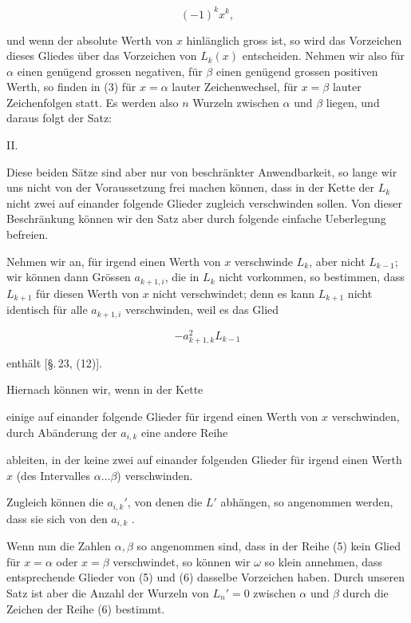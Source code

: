 \[
(-1)^k x^k,
\]

und wenn der absolute Werth von $x$ hinlänglich gross ist, so wird das Vorzeichen dieses Gliedes über das Vorzeichen von $L_k(x)$ entscheiden. Nehmen wir also für $\alpha$ einen genügend grossen negativen, für $\beta$ einen genügend grossen positiven Werth, so finden in (3) für $x=\alpha$ lauter Zeichenwechsel, für $x=\beta$ lauter Zeichenfolgen statt. Es werden also $n$ Wurzeln zwischen $\alpha$ und $\beta$ liegen, und daraus folgt der Satz:

II.\ 

Diese beiden Sätze sind aber nur von beschränkter Anwendbarkeit, so lange wir uns nicht von der Voraussetzung frei machen können, dass in der Kette der $L_k$ nicht zwei auf einander folgende Glieder zugleich verschwinden sollen. Von dieser Beschränkung können wir den Satz aber durch folgende einfache Ueberlegung befreien.

Nehmen wir an, für irgend einen Werth von $x$ verschwinde $L_k$, aber nicht $L_{k-1}$; wir können dann Grössen $a_{k+1,i}$, die in $L_k$ nicht vorkommen, so bestimmen, dass $L_{k+1}$ für diesen Werth von $x$ nicht verschwindet; denn es kann $L_{k+1}$ nicht identisch für alle $a_{k+1,i}$ verschwinden, weil es das Glied

\[
-a_{k+1,k}^2 L_{k-1}
\]

enthält [\S.\,23, (12)].

Hiernach können wir, wenn in der Kette


einige auf einander folgende Glieder für irgend einen Werth von $x$ verschwinden, durch Abänderung der $a_{i,k}$ eine andere Reihe


ableiten, in der keine zwei auf einander folgenden Glieder für irgend einen Werth $x$ (des Intervalles $\alpha \ldots \beta$) verschwinden.

Zugleich können die $a_{i,k}'$, von denen die $L'$ abhängen, so angenommen werden, dass sie sich von den $a_{i,k}$ .

Wenn nun die Zahlen $\alpha, \beta$ so angenommen sind, dass in der Reihe (5) kein Glied für $x=\alpha$ oder $x=\beta$ verschwindet, so können wir $\omega$ so klein annehmen, dass entsprechende Glieder von (5) und (6) dasselbe Vorzeichen haben. Durch unseren Satz ist aber die Anzahl der Wurzeln von $L_n'=0$ zwischen $\alpha$ und $\beta$ durch die Zeichen der Reihe (6) bestimmt.
